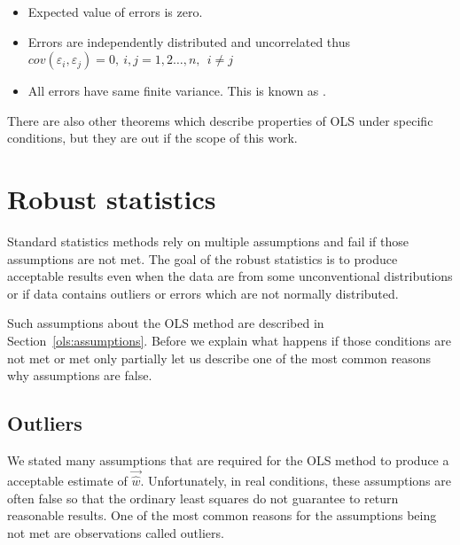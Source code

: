 \begin{itemize} \label{ols:assumptions}
  \item Expected value of errors is zero.
  \item Errors are independently distributed and uncorrelated thus \\ $cov(\varepsilon_i, \varepsilon_j) = 0, \ i, j = 1, 2 \ldots , n, \ \ i \neq j$
 \item All errors have same finite variance. This is known as .
\end{itemize}


There are also other theorems which describe properties of OLS under specific conditions, but they are out if the scope of this work.



\section{Robust statistics} \label{section:roboust}
Standard statistics methods rely on multiple assumptions and fail if those assumptions are not met. The goal of the robust statistics is to produce acceptable results even when the data are from some unconventional distributions or if data contains outliers or errors which are not normally distributed. 

Such assumptions about the OLS method are described in Section~\ref{ols:assumptions}. Before we explain what happens if those conditions are not met or met only partially let us describe one of the most common reasons why assumptions are false.

\subsection{Outliers} \label{outliers:info}
We stated many assumptions that are required for the OLS method to produce a acceptable estimate of $\vec{\hat{w}}$. Unfortunately, in real conditions, these assumptions are often false so that the ordinary least squares do not guarantee to return reasonable results. One of the most common reasons for the assumptions being not met are observations called outliers.

